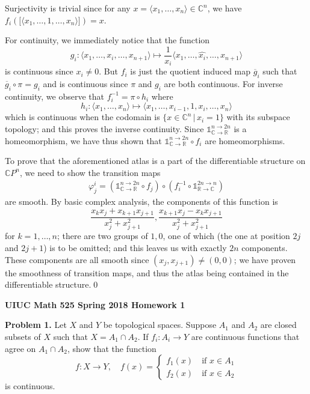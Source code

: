 \documentclass[10pt]{article}
\begin{document}
\begin{CJK*}{UTF8}{gbsn}
Surjectivity is trivial since for any $x=\langle x_1,\dots,x_n\rangle\in\mathbb{C}^n$, we have $f_i(\lbrack\langle x_1,\dots,1,\dots,x_n\rangle\rbrack)=x$.

For continuity, we immediately notice that the function $$g_i:\langle x_1,\dots,x_i,\dots,x_{n+1}\rangle\mapsto\frac{1}{x_i}\langle x_1,\dots,\widehat{x_i},\dots,x_{n+1}\rangle$$ is continuous since $x_i\neq0$. But $f_i$ is just the quotient induced map $\overline{g}_i$ such that $\overline{g}_i\circ\pi=g_i$ and is continuous since $\pi$ and $g_i$ are both continuous. For inverse continuity, we observe that $f^{-1}_i=\pi\circ h_i$ where $$h_i:\langle x_1,\dots,x_n\rangle\mapsto\langle x_1,\dots,x_{i-1},1,x_{i},\dots,x_n\rangle$$ which is continuous when the codomain is $\{x\in\mathbb{C}^n\,\big|\,x_i=1\}$ with its subspace topology; and this proves the inverse continuity. Since $\mathbb{1}^{n\to2n}_{\mathbb{C}\to\mathbb{R}}$ is a homeomorphism, we have thus shown that $\mathbb{1}^{n\to2n}_{\mathbb{C}\to\mathbb{R}}\circ f_i$ are homeomorphisms.

To prove that the aforementioned atlas is a part of the differentiable structure on $\mathbb{C}P^n$, we need to show the transition maps \begin{align*}\varphi^i_j=(\mathbb{1}^{n\to2n}_{\mathbb{C}\to\mathbb{R}}\circ f_j)\circ(f^{-1}_i\circ\mathbb{1}^{2n\to n}_{\mathbb{R}\to\mathbb{C}})\end{align*} are smooth. By basic complex analysis, the components of this function is $$\frac{x_kx_j+x_{k+1}x_{j+1}}{x_j^2+x_{j+1}^2},\frac{x_{k+1}x_j-x_kx_{j+1}}{x_j^2+x_{j+1}^2}$$ for $k=1,\dots,n$; there are two groups of $1,0$, one of which (the one at position $2j$ and $2j+1$) is to be omitted; and this leaves us with exactly $2n$ components. These components are all smooth since $(x_j,x_{j+1})\neq(0,0)$; we have proven the smoothness of transition maps, and thus the atlas being contained in the differentiable structure.\qed

\newpage
\textbf{UIUC Math 525 Spring 2018 Homework 1}

\textbf{Problem 1.} Let $X$ and $Y$ be topological spaces. Suppose $A_1$ and $A_2$ are closed subsets of $X$ such that $X=A_1\cap A_2$. If $f_i:A_i\to Y$ are continuous functions that agree on $A_1\cap A_2$, show that the function $$f:X\to Y,\quad f(x)=\begin{cases}f_1(x)\quad\text{if }x\in A_1\\f_2(x)\quad\text{if }x\in A_2\end{cases}$$ is continuous.


\end{CJK*}
\end{document}
